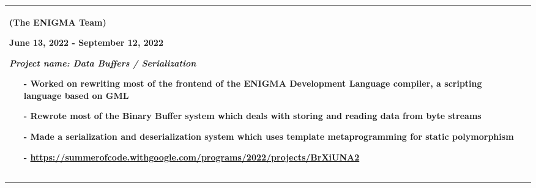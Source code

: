 \documentclass[12pt]{article}
\newcommand{\primarycolor}{red}
\newcommand{\mysection}[1]{{\large\color{\primarycolor}{#1}}}
\begin{document}
\begin{tabularx}{\textwidth}{p{0.4\hsize}|X}
\begin{itemize}[itemsep=1.5ex,leftmargin=1ex]
\begin{itemize}[itemsep=3ex, leftmargin=0.1ex]
                \textbf{(The ENIGMA Team)}

                {\color{\primarycolor}June 13, 2022 - September 12, 2022}

                \textit{Project name: Data Buffers / Serialization}

                \begin{itemize}[itemsep=1ex, leftmargin=3.5ex]
                    \item[-] Worked on rewriting most of the frontend of the ENIGMA Development Language compiler, a scripting language based on GML
                    \item[-] Rewrote most of the Binary Buffer system which deals with storing and reading data from byte streams
                    \item[-] Made a serialization and deserialization system which uses template metaprogramming for static polymorphism
                    \item[-] \url{https://summerofcode.withgoogle.com/programs/2022/projects/BrXiUNA2}
                \end{itemize}
            \end{itemize}
        \end{itemize} \\

        \hline
    \end{tabularx}

    \clearpage
    \vspace{1ex}
    \hrule
    \vspace{2ex}
    \noindent\mysection{Projects}
\end{document}
